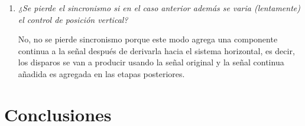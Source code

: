 \documentclass{article}
\begin{document}
\begin{enumerate}
	\item \noindent \textit{¿Se pierde el sincronismo si en el caso anterior además se varia (lentamente) el control de posición vertical?}
	\smallskip

	No, no se pierde sincronismo porque este modo agrega una componente continua a la señal después de derivarla hacia el sistema horizontal, es decir, los disparos se van a producir usando la señal original y la señal continua añadida es agregada en las etapas posteriores.
	\bigskip

\end{enumerate}
\bigskip




\section{Conclusiones}
\end{document}
